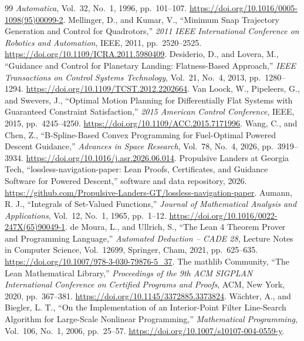 \begin{thebibliography}{99}
\emph{Automatica}, Vol.~32, No.~1, 1996, pp.~101--107. \url{https://doi.org/10.1016/0005-1098(95)00099-2}.
 Mellinger, D., and Kumar, V., ``Minimum Snap Trajectory Generation and Control for Quadrotors,''
\emph{2011 IEEE International Conference on Robotics and Automation}, IEEE, 2011, pp.~2520--2525. \url{https://doi.org/10.1109/ICRA.2011.5980409}.
 Desiderio, D., and Lovera, M., ``Guidance and Control for Planetary Landing: Flatness-Based Approach,''
\emph{IEEE Transactions on Control Systems Technology}, Vol.~21, No.~4, 2013, pp.~1280--1294. \url{https://doi.org/10.1109/TCST.2012.2202664}.
 Van Loock, W., Pipeleers, G., and Swevers, J., ``Optimal Motion Planning for Differentially Flat Systems with
Guaranteed Constraint Satisfaction,'' \emph{2015 American Control Conference}, IEEE, 2015, pp.~4245--4250. \url{https://doi.org/10.1109/ACC.2015.7171996}.
 Wang, C., and Chen, Z., ``B-Spline-Based Convex Programming for Fuel-Optimal Powered Descent Guidance,''
\emph{Advances in Space Research}, Vol.~78, No.~4, 2026, pp.~3919--3934. \url{https://doi.org/10.1016/j.asr.2026.06.014}.
 Propulsive Landers at Georgia Tech, ``lossless-navigation-paper: Lean Proofs, Certificates, and Guidance Software for
Powered Descent,'' software and data repository, 2026. \url{https://github.com/Propulsive-Landers-GT/lossless-navigation-paper}.
 Aumann, R. J., ``Integrals of Set-Valued Functions,'' \emph{Journal of Mathematical Analysis and Applications},
Vol.~12, No.~1, 1965, pp.~1--12. \url{https://doi.org/10.1016/0022-247X(65)90049-1}.
 de Moura, L., and Ullrich, S., ``The Lean 4 Theorem Prover and Programming Language,'' \emph{Automated Deduction --
CADE 28}, Lecture Notes in Computer Science, Vol.~12699, Springer, Cham, 2021, pp.~625--635. \url{https://doi.org/10.1007/978-3-030-79876-5_37}.
 The mathlib Community, ``The Lean Mathematical Library,'' \emph{Proceedings of the 9th ACM SIGPLAN International
Conference on Certified Programs and Proofs}, ACM, New York, 2020, pp.~367--381. \url{https://doi.org/10.1145/3372885.3373824}.
 W\"achter, A., and Biegler, L. T., ``On the Implementation of an Interior-Point Filter Line-Search Algorithm for
Large-Scale Nonlinear Programming,'' \emph{Mathematical Programming}, Vol.~106, No.~1, 2006, pp.~25--57. \url{https://doi.org/10.1007/s10107-004-0559-y}.
\end{thebibliography}

